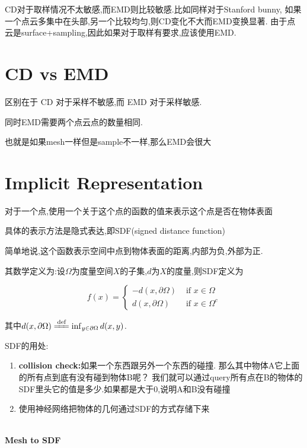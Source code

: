CD对于取样情况不太敏感,而EMD则比较敏感.比如同样对于Stanford bunny,
如果一个点云多集中在头部,另一个比较均匀,则CD变化不大而EMD变换显著.
由于点云是surface+sampling,因此如果对于取样有要求,应该使用EMD.

\section{CD vs EMD}

区别在于 CD 对于采样不敏感,而 EMD 对于采样敏感.

同时EMD需要两个点云点的数量相同.

也就是如果mesh一样但是sample不一样,那么EMD会很大

\section{Implicit Representation}

对于一个点,使用一个关于这个点的函数的值来表示这个点是否在物体表面

具体的表示方法是隐式表达,即SDF(signed distance function)

简单地说,这个函数表示空间中点到物体表面的距离,内部为负,外部为正.

其数学定义为:设$\Omega$为度量空间$X$的子集,$d$为$X$的度量,则SDF定义为

\begin{equation}
    f(x)=\begin{cases}
        -d(x, \partial \Omega) & \text { if } x \in \Omega 
        \\
        d(x, \partial \Omega) & \text { if } x \in \Omega^{c}
    \end{cases}
\end{equation}

其中$d(x, \partial \Omega) \xlongequal{\text{def}} \inf_{y \in \partial \Omega} d(x, y)$.

SDF的用处:

\begin{enumerate}
    \item \textbf{collision check:}如果一个东西跟另外一个东西的碰撞.
    那么其中物体A它上面的所有点到底有没有碰到物体B呢？
    我们就可以通过query所有点在B的物体的SDF里头它的值是多少.如果都是大于0,说明A和B没有碰撞
    \item 使用神经网络把物体的几何通过SDF的方式存储下来
\end{enumerate}

\textbf{\\Mesh to SDF}

